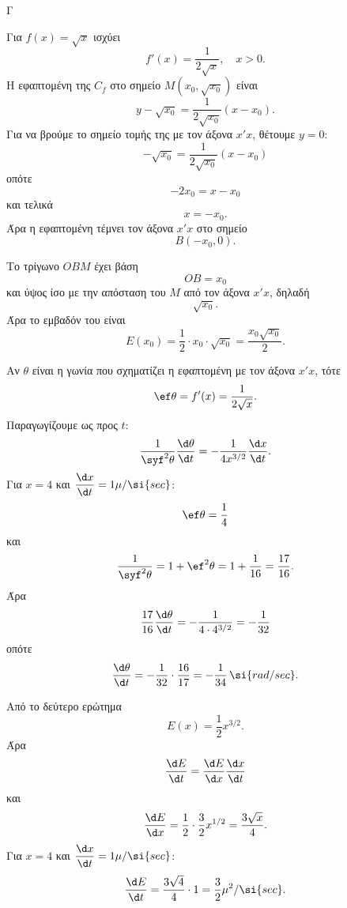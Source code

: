\begin{thema}{Γ}
\begin{erwthma}
\item Για $f(x)=\sqrt{x}$ ισχύει
\[
f'(x)=\frac{1}{2\sqrt{x}}, \quad x>0.
\]
Η εφαπτομένη της $C_f$ στο σημείο $M(x_0,\sqrt{x_0})$ είναι
\[
y-\sqrt{x_0}=\frac{1}{2\sqrt{x_0}}(x-x_0).
\]
Για να βρούμε το σημείο τομής της με τον άξονα $x'x$, θέτουμε $y=0$:
\[
-\sqrt{x_0}=\frac{1}{2\sqrt{x_0}}(x-x_0)
\]
οπότε
\[
-2x_0=x-x_0
\]
και τελικά
\[
x=-x_0.
\]
Άρα η εφαπτομένη τέμνει τον άξονα $x'x$ στο σημείο
\[
B(-x_0,0).
\]

\item Το τρίγωνο $OBM$ έχει βάση
\[
OB=x_0
\]
και ύψος ίσο με την απόσταση του $M$ από τον άξονα $x'x$, δηλαδή
\[
\sqrt{x_0}.
\]
Άρα το εμβαδόν του είναι
\[
E(x_0)=\frac{1}{2}\cdot x_0\cdot \sqrt{x_0}
=
\frac{x_0\sqrt{x_0}}{2}.
\]

\item Αν $\theta$ είναι η γωνία που σχηματίζει η εφαπτομένη με τον άξονα $x'x$, τότε
\[
\ef \theta=f'(x)=\frac{1}{2\sqrt{x}}.
\]
Παραγωγίζουμε ως προς $t$:
\[
\frac{1}{\syf^2\theta}\frac{\d \theta}{\d t}
=
-\frac{1}{4x^{3/2}}\frac{\d x}{\d t}.
\]
Για $x=4$ και $\dfrac{\d x}{\d t}=1\mu/\si{sec}$:
\[
\ef\theta=\frac{1}{4}
\]
και
\[
\frac{1}{\syf^2\theta}=1+\ef^2\theta=1+\frac{1}{16}=\frac{17}{16}.
\]
Άρα
\[
\frac{17}{16}\frac{\d \theta}{\d t}
=
-\frac{1}{4\cdot 4^{3/2}}
=
-\frac{1}{32}
\]
οπότε
\[
\frac{\d \theta}{\d t}
=
-\frac{1}{32}\cdot \frac{16}{17}
=
-\frac{1}{34}\,\si{rad/sec}.
\]

\item Από το δεύτερο ερώτημα
\[
E(x)=\frac{1}{2}x^{3/2}.
\]
Άρα
\[
\frac{\d E}{\d t}=\frac{\d E}{\d x}\frac{\d x}{\d t}
\]
και
\[
\frac{\d E}{\d x}=\frac{1}{2}\cdot \frac{3}{2}x^{1/2}=\frac{3\sqrt{x}}{4}.
\]
Για $x=4$ και $\dfrac{\d x}{\d t}=1\mu/\si{sec}$:
\[
\frac{\d E}{\d t}
=
\frac{3\sqrt{4}}{4}\cdot 1
=
\frac{3}{2}\mu^2/\si{sec}.
\]
\end{erwthma}
\end{thema}
